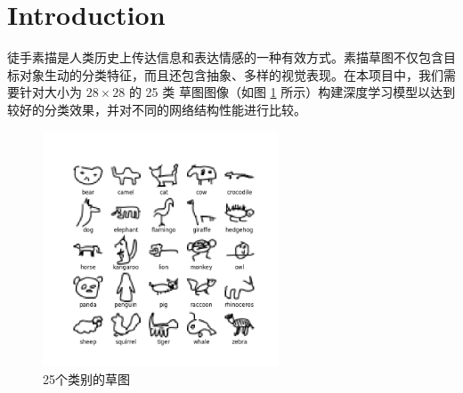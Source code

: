 \section{Introduction}
徒手素描是人类历史上传达信息和表达情感的一种有效方式。素描草图不仅包含目标对象生动的分类特征，而且还包含抽象、多样的视觉表现。在本项目中，我们需要针对大小为 $28\times 28$ 的 25 类 草图图像（如图 \ref{fig:cate} 所示）构建深度学习模型以达到较好的分类效果，并对不同的网络结构性能进行比较。

\begin{figure}[ht]
    \centering
    \includegraphics[width=7cm]{img/sketches.png}
    \caption{25个类别的草图}
    \label{fig:cate}
\end{figure}